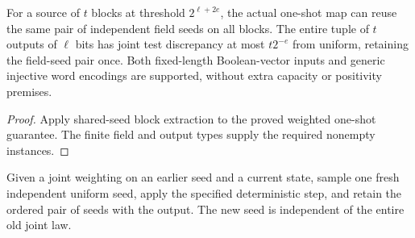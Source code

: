 \begin{theorem}
  \label{thm:lowerbounds-algebraic-one-shot-blocks}
  \leanok
  For a source of $t$ blocks at threshold $2^{\ell+2e}$, the actual one-shot
  map can reuse the same pair of independent field seeds on all blocks.
  The entire tuple of $t$ outputs of $\ell$ bits has joint test discrepancy
  at most $t2^{-e}$ from uniform, retaining the field-seed pair once.
  Both fixed-length Boolean-vector inputs and generic injective word
  encodings are supported, without extra capacity or positivity premises.
\end{theorem}
\begin{proof}
  \leanok
  Apply shared-seed block extraction to the proved weighted one-shot
  guarantee. The finite field and output types supply the required
  nonempty instances.
\end{proof}

\begin{definition}
  \label{def:lowerbounds-algebraic-retained-seed-step}
  \leanok
  Given a joint weighting on an earlier seed and a current state, sample
  one fresh independent uniform seed, apply the specified deterministic
  step, and retain the ordered pair of seeds with the output. The new seed
  is independent of the entire old joint law.
\end{definition}

